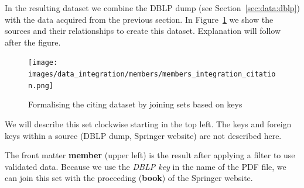 \documentclass{ou-report}
\newcommand{\dblp}{DBLP}
\begin{document}






In the resulting dataset we combine the \dblp{} dump (see Section~\ref{sec:data:dblp}) 
with the data acquired from the previous section.
In Figure~\ref{fig:members_integration_citation} we show the sources and their 
relationships to create this dataset. Explanation will follow after the figure.
\begin{figure}[H]
    \centering
    \texttt{[image: images/data\_integration/members/members\_integration\_citation.png]}
    \caption{Formalising the citing dataset by joining sets based on keys}
    \label{fig:members_integration_citation}
\end{figure}

We will describe this set clockwise starting in the top left. The keys and foreign keys 
within a source (\dblp{} dump, Springer website) are not described here.

The front matter \textbf{member} (upper left) is the result after applying a filter to use 
validated data. Because we use the \textit{\dblp{} key} in the name of the PDF file, we 
can join this set with the proceeding (\textbf{book}) of the Springer website.
\end{document}

